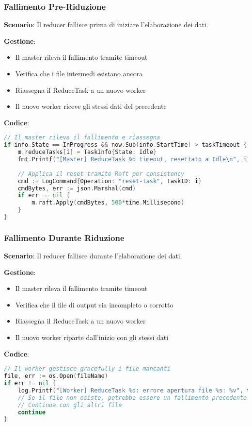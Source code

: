 \documentclass[12pt,a4paper]{article}
\begin{document}
\subsubsection{Fallimento Pre-Riduzione}

\textbf{Scenario}: Il reducer fallisce prima di iniziare l'elaborazione dei dati.

\textbf{Gestione}:
\begin{itemize}
\item Il master rileva il fallimento tramite timeout
\item Verifica che i file intermedi esistano ancora
\item Riassegna il ReduceTask a un nuovo worker
\item Il nuovo worker riceve gli stessi dati del precedente
\end{itemize}

\textbf{Codice}:
\begin{lstlisting}[language=go]
// Il master rileva il fallimento e riassegna
if info.State == InProgress && now.Sub(info.StartTime) > taskTimeout {
    m.reduceTasks[i] = TaskInfo{State: Idle}
    fmt.Printf("[Master] ReduceTask %d timeout, resettato a Idle\n", i)
    
    // Applica il reset tramite Raft per consistency
    cmd := LogCommand{Operation: "reset-task", TaskID: i}
    cmdBytes, err := json.Marshal(cmd)
    if err == nil {
        m.raft.Apply(cmdBytes, 500*time.Millisecond)
    }
}
\end{lstlisting}

\subsubsection{Fallimento Durante Riduzione}

\textbf{Scenario}: Il reducer fallisce durante l'elaborazione dei dati.

\textbf{Gestione}:
\begin{itemize}
\item Il master rileva il fallimento tramite timeout
\item Verifica che il file di output sia incompleto o corrotto
\item Riassegna il ReduceTask a un nuovo worker
\item Il nuovo worker riparte dall'inizio con gli stessi dati
\end{itemize}

\textbf{Codice}:
\begin{lstlisting}[language=go]
// Il worker gestisce gracefully i file mancanti
file, err := os.Open(fileName)
if err != nil {
    log.Printf("[Worker] ReduceTask %d: errore apertura file %s: %v", task.TaskID, fileName, err)
    // Se il file non esiste, potrebbe essere un fallimento precedente
    // Continua con gli altri file
    continue
}
\end{lstlisting}
\end{document}
